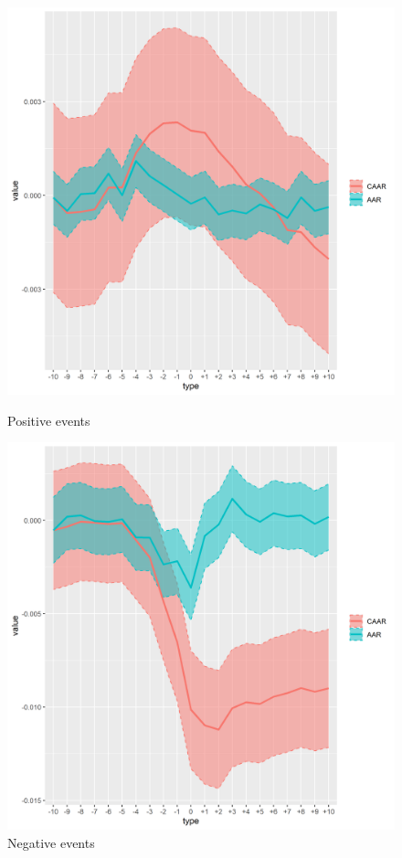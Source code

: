 \begin{figure}[!tbp]
  \centering
 \begin{minipage}[b]{0.45\textwidth}
    \includegraphics[scale=0.45]{Projekt/1.Figures analysis/ST_positive_all_CI.png}
    \caption{Positive events}
  \end{minipage}
  \hfill
  \begin{minipage}[b]{0.45\textwidth}
    \includegraphics[scale=0.45]{Projekt/1.Figures analysis/ST_negative_all_CI.png}
    \caption{Negative events}
  \end{minipage}
\end{figure}


